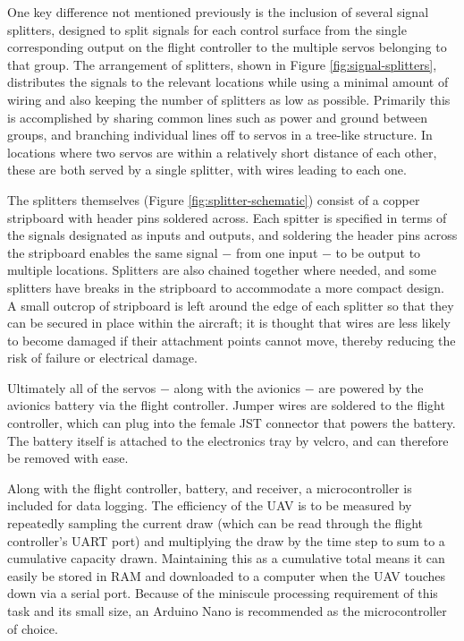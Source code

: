 \documentclass[../../main.tex]{subfiles}
\begin{document}
One key difference not mentioned previously is the inclusion of several signal splitters, designed to split signals for each control surface from the single corresponding output on the flight controller to the multiple servos belonging to that group.
The arrangement of splitters, shown in Figure \ref{fig:signal-splitters}, distributes the signals to the relevant locations while using a minimal amount of wiring and also keeping the number of splitters as low as possible.
Primarily this is accomplished by sharing common lines such as power and ground between groups, and branching individual lines off to servos in a tree-like structure.
In locations where two servos are within a relatively short distance of each other, these are both served by a single splitter, with wires leading to each one.

The splitters themselves (Figure \ref{fig:splitter-schematic}) consist of a copper stripboard with header pins soldered across.
Each spitter is specified in terms of the signals designated as inputs and outputs, and soldering the header pins across the stripboard enables the same signal $-$ from one input $-$ to be output to multiple locations.
Splitters are also chained together where needed, and some splitters have breaks in the stripboard to accommodate a more compact design.
A small outcrop of stripboard is left around the edge of each splitter so that they can be secured in place within the aircraft; it is thought that wires are less likely to become damaged if their attachment points cannot move, thereby reducing the risk of failure or electrical damage.


Ultimately all of the servos $-$ along with the avionics $-$ are powered by the avionics battery via the flight controller.
Jumper wires are soldered to the flight controller, which can plug into the female JST connector that powers the battery.
The battery itself is attached to the electronics tray by velcro, and can therefore be removed with ease.

Along with the flight controller, battery, and receiver, a microcontroller is included for data logging.
The efficiency of the UAV is to be measured by repeatedly sampling the current draw (which can be read through the flight controller's UART port) and multiplying the draw by the time step to sum to a cumulative capacity drawn.
Maintaining this as a cumulative total means it can easily be stored in RAM and downloaded to a computer when the UAV touches down via a serial port.
Because of the miniscule processing requirement of this task and its small size, an Arduino Nano is recommended as the microcontroller of choice.
\end{document}
